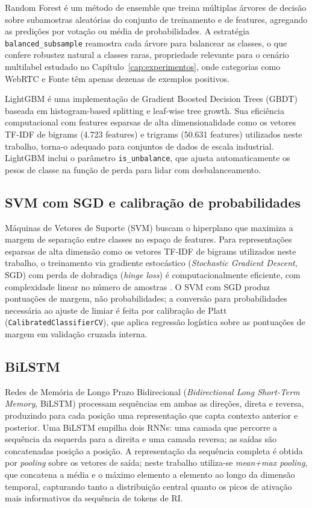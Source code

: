 Random Forest \cite{breiman2001} é um método de ensemble que treina múltiplas
árvores de decisão sobre subamostras aleatórias do conjunto de treinamento e de
features, agregando as predições por votação ou média de probabilidades. A
estratégia \texttt{balanced\_subsample} reamostra cada árvore para balancear as
classes, o que confere robustez natural a classes raras, propriedade relevante
para o cenário multilabel estudado no Capítulo~\ref{cap:experimentos}, onde
categorias como WebRTC e Fonte têm apenas dezenas de exemplos positivos.

LightGBM \cite{ke2017} é uma implementação de Gradient Boosted Decision
Trees (GBDT) baseada em histogram-based splitting e leaf-wise tree
growth. Sua eficiência computacional com features esparsas de alta dimensionalidade
como os vetores TF-IDF de bigrams (4.723 features) e trigrams (50.631 features)
utilizados neste trabalho, torna-o adequado para conjuntos de dados de escala
industrial. LightGBM inclui o parâmetro \texttt{is\_unbalance}, que ajusta
automaticamente os pesos de classe na função de perda para lidar com
desbalanceamento.

\subsection{SVM com SGD e calibração de probabilidades}
\label{sub:svm-fund}

Máquinas de Vetores de Suporte (SVM) buscam o hiperplano que maximiza a margem
de separação entre classes no espaço de features. Para representações esparsas
de alta dimensão como os vetores TF-IDF de bigrams utilizados neste trabalho,
o treinamento via gradiente estocástico (\textit{Stochastic Gradient Descent},
SGD) com perda de dobradiça (\textit{hinge loss}) é computacionalmente
eficiente, com complexidade linear no número de amostras \cite{manning2008}.
O SVM com SGD produz pontuações de margem, não probabilidades; a conversão
para probabilidades necessária ao ajuste de limiar é feita por calibração de
Platt (\texttt{CalibratedClassifierCV}), que aplica regressão logística sobre
as pontuações de margem em validação cruzada interna.

\subsection{BiLSTM}
\label{sub:bilstm-fund}

Redes de Memória de Longo Prazo Bidirecional (\textit{Bidirectional Long
Short-Term Memory}, BiLSTM) processam sequências em ambas as direções, direta
e reversa, produzindo para cada posição uma representação que capta contexto
anterior e posterior. Uma BiLSTM empilha dois RNNs: uma camada que percorre a
sequência da esquerda para a direita e uma camada reversa; as saídas são
concatenadas posição a posição. A representação da sequência completa é obtida
por \textit{pooling} sobre os vetores de saída; neste trabalho utiliza-se
\textit{mean+max pooling}, que concatena a média e o máximo elemento a elemento
ao longo da dimensão temporal, capturando tanto a distribuição central quanto
os picos de ativação mais informativos da sequência de tokens de RI.

